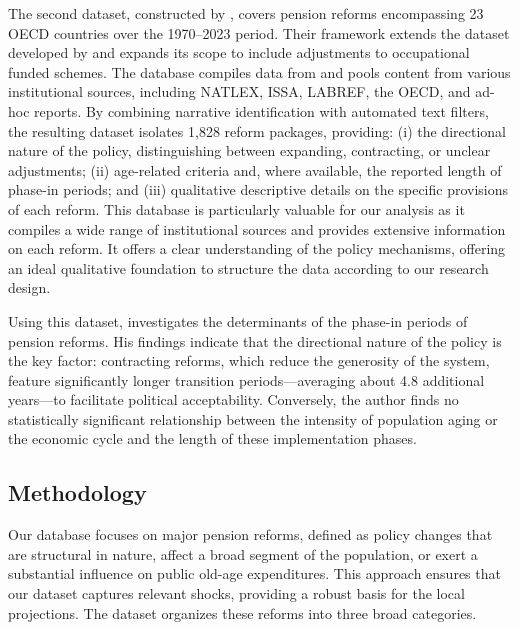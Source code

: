 \documentclass[11pt,english,a4paper, twoside, authoryear]{article}
\begin{document}
The second dataset, constructed by \citet{romp_political_2024}, covers pension reforms encompassing 23 OECD countries over the 1970–2023 period. Their framework extends the dataset developed by \citet{Beetsma2020} and expands its scope to include adjustments to occupational funded schemes. The database compiles data from \citet{BiZubairy2023} and pools content from various institutional sources, including NATLEX, ISSA, LABREF, the OECD, and ad-hoc reports. By combining narrative identification with automated text filters, the resulting dataset isolates 1,828 reform packages, providing: (i) the directional nature of the policy, distinguishing between expanding, contracting, or unclear adjustments; (ii) age-related criteria and, where available, the reported length of phase-in periods; and (iii) qualitative descriptive details on the specific provisions of each reform. This database is particularly valuable for our analysis as it compiles a wide range of institutional sources and provides extensive information on each reform. It offers a clear understanding of the policy mechanisms, offering an ideal qualitative foundation to structure the data according to our research design.

Using this dataset, \citet{romp_political_2024} investigates the determinants of the phase-in periods of pension reforms. His findings indicate that the directional nature of the policy is the key factor: contracting reforms, which reduce the generosity of the system, feature significantly longer transition periods—averaging about 4.8 additional years—to facilitate political acceptability. Conversely, the author finds no statistically significant relationship between the intensity of population aging or the economic cycle and the length of these implementation phases.


\subsection{Methodology}

Our database focuses on major pension reforms, defined as policy changes that are structural in nature, affect a broad segment of the population, or exert a substantial influence on public old-age expenditures. This approach ensures that our dataset captures relevant shocks, providing a robust basis for the local projections. The dataset organizes these reforms into three broad categories.
\end{document}
